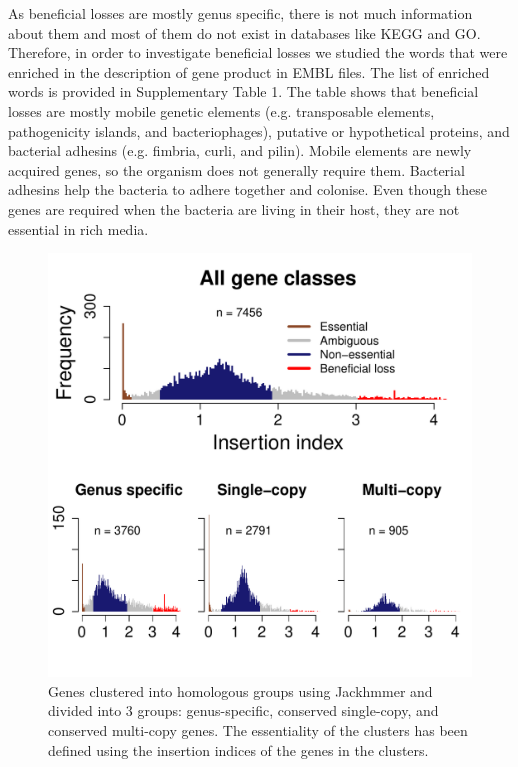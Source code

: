\documentclass[12pt,letterpaper]{article}
\begin{document}
As beneficial losses are mostly genus specific, there is not much information about them and most of them do not exist in databases like KEGG and GO. Therefore, in order to investigate beneficial losses we studied the words that were enriched in the description of gene product in EMBL files. The list of enriched words is provided in Supplementary Table 1. The table shows that beneficial losses are mostly mobile genetic elements (e.g. transposable elements, pathogenicity islands, and bacteriophages), putative or hypothetical proteins, and bacterial adhesins (e.g. fimbria, curli, and pilin). Mobile elements are newly acquired genes, so the organism does not generally require them. Bacterial adhesins help the bacteria to adhere together and colonise. Even though these genes are required when the bacteria are living in their host, they are not essential in rich media.

\begin{figure}
\includegraphics[scale=0.8]{fig5.pdf}
\caption{Genes clustered into homologous groups using Jackhmmer and divided into 3 groups: genus-specific, conserved single-copy, and conserved multi-copy genes. The essentiality of the clusters has been defined using the insertion indices of the genes in the clusters.}
\label{fig:fig5}
\end{figure}
\end{document}
